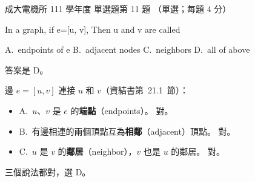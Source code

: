 \begin{pastexam}[label={px:ncku-111-ee-ds-11}]{成大電機所 111 學年度 單選題第 11 題}
（單選；每題 4 分）

In a graph, if e=[u, v], Then u and v are called

A.~endpoints of e \qquad B.~adjacent nodes \qquad C.~neighbors \qquad D.~all of above
\end{pastexam}

\begin{pastsoln}
答案是 D。

邊 $e = [u, v]$ 連接 $u$ 和 $v$（資結書第~21.1~節）：
\begin{itemize}
\item A.~$u$、$v$ 是 $e$ 的\textbf{端點}（endpoints）。 對。
\item B.~有邊相連的兩個頂點互為\textbf{相鄰}（adjacent）頂點。 對。
\item C.~$u$ 是 $v$ 的\textbf{鄰居}（neighbor），$v$ 也是 $u$ 的鄰居。 對。
\end{itemize}
三個說法都對，選 D。
\end{pastsoln}
